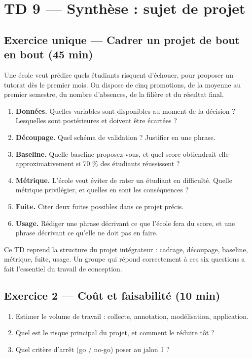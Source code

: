 \section*{TD 9 --- Synthèse : sujet de projet}

\subsection*{Exercice unique --- Cadrer un projet de bout en bout \hfill \normalfont\footnotesize (45 min)}
Une école veut prédire quels étudiants risquent d'échouer, pour proposer un
tutorat dès le premier mois. On dispose de cinq promotions, de la moyenne au
premier semestre, du nombre d'absences, de la filière et du résultat final.

\begin{enumerate}
  \item \textbf{Données.} Quelles variables sont disponibles au moment de la
        décision ? Lesquelles sont postérieures et doivent être écartées ?
  \item \textbf{Découpage.} Quel schéma de validation ? Justifier en une phrase.
  \item \textbf{Baseline.} Quelle baseline proposez-vous, et quel score
        obtiendrait-elle approximativement si 70 \% des étudiants réussissent ?
  \item \textbf{Métrique.} L'école veut éviter de rater un étudiant en
        difficulté. Quelle métrique privilégier, et quelles en sont les
        conséquences ?
  \item \textbf{Fuite.} Citer deux fuites possibles dans ce projet précis.
  \item \textbf{Usage.} Rédiger une phrase décrivant ce que l'école fera du
        score, et une phrase décrivant ce qu'elle ne doit pas en faire.
\end{enumerate}

\vspace{3mm}
{\footnotesize\color{gris}
Ce TD reprend la structure du projet intégrateur : cadrage, découpage,
baseline, métrique, fuite, usage. Un groupe qui répond correctement à ces six
questions a fait l'essentiel du travail de conception.}


\subsection*{Exercice 2 --- Coût et faisabilité \hfill \normalfont\footnotesize (10 min)}
\begin{enumerate}
  \item Estimer le volume de travail : collecte, annotation, modélisation,
        application.
  \item Quel est le risque principal du projet, et comment le réduire tôt ?
  \item Quel critère d'arrêt (go / no-go) poser au jalon 1 ?
\end{enumerate}


